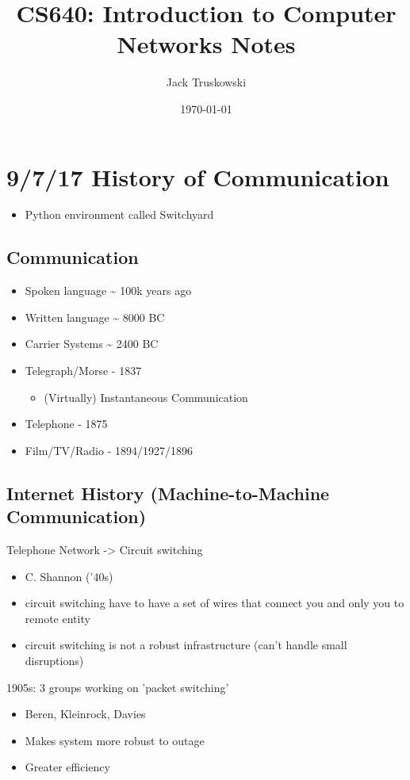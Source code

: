 \documentclass[11pt]{article}
\author{Jack Truskowski}
\date{\today}
\title{CS640: Introduction to Computer Networks Notes}
\begin{document}
\maketitle
\tableofcontents


\section{9/7/17  History of Communication}
\label{sec:orgheadline3}
\begin{itemize}
\item Python environment called Switchyard
\end{itemize}
\subsection{Communication}
\label{sec:orgheadline1}
\begin{itemize}
\item Spoken language \textasciitilde{} 100k years ago
\item Written language \textasciitilde{} 8000 BC
\item Carrier Systems \textasciitilde{} 2400 BC

\item Telegraph/Morse - 1837
\begin{itemize}
\item (Virtually) Instantaneous Communication
\end{itemize}

\item Telephone - 1875
\item Film/TV/Radio - 1894/1927/1896
\end{itemize}

\subsection{Internet History (Machine-to-Machine Communication)}
\label{sec:orgheadline2}
Telephone Network -> Circuit switching
\begin{itemize}
\item C. Shannon ('40s)
\item circuit switching  have to have a set of wires that connect you and only you to remote entity
\item circuit switching is not a robust infrastructure (can't handle small
disruptions)
\end{itemize}

1905s: 3 groups working on 'packet switching'
\begin{itemize}
\item Beren, Kleinrock, Davies
\item Makes system more robust to outage
\item Greater efficiency
\end{itemize}
\end{document}

